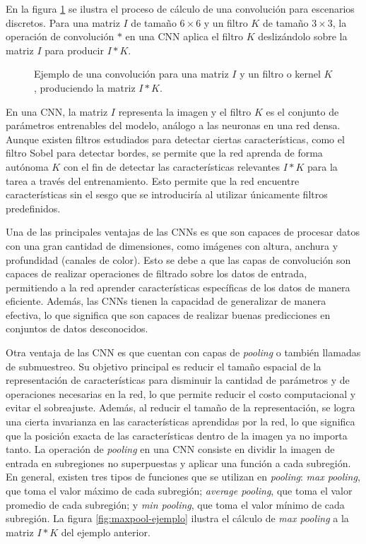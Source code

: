 En la figura \ref{fig:convolucion-ejemplo} se ilustra el proceso de cálculo de una convolución para escenarios
discretos. Para una matriz $I$ de tamaño $6\times6$ y un filtro $K$ de tamaño $3\times3$, la operación de convolución
$*$ en una CNN aplica el filtro $K$ deslizándolo sobre la matriz $I$ para producir $I*K$.

\begin{figure}[H]
  \centering
  \caption[Operador {\it convolución}]{Ejemplo de una convolución para una matriz $I$ y un filtro o kernel $K$, produciendo la matriz $I*K$.}
  \label{fig:convolucion-ejemplo}
\end{figure}

En una CNN, la matriz $I$ representa la imagen y el filtro $K$ es el conjunto de parámetros entrenables del modelo,
análogo a las neuronas en una red densa. Aunque existen filtros estudiados para detectar ciertas características, como
el filtro Sobel para detectar bordes, se permite que la red aprenda de forma autónoma $K$ con el fin de detectar las
características relevantes $I*K$ para la tarea a través del entrenamiento. Esto permite que la red encuentre
características sin el sesgo que se introduciría al utilizar únicamente filtros predefinidos.

Una de las principales ventajas de las CNNs es que son capaces de procesar datos con una gran cantidad de dimensiones,
como imágenes con altura, anchura y profundidad (canales de color). Esto se debe a que las capas de convolución son
capaces de realizar operaciones de filtrado sobre los datos de entrada, permitiendo a la red aprender características
específicas de los datos de manera eficiente. Además, las CNNs tienen la capacidad de generalizar de manera efectiva,
lo que significa que son capaces de realizar buenas predicciones en conjuntos de datos desconocidos.

Otra ventaja de las CNN es que cuentan con capas de {\it pooling} o también llamadas de submuestreo. Su objetivo
principal es reducir el tamaño espacial de la representación de características para disminuir la cantidad de
parámetros y de operaciones necesarias en la red, lo que permite reducir el costo computacional y evitar el
sobreajuste. Además, al reducir el tamaño de la representación, se logra una cierta invarianza en las características
aprendidas por la red, lo que significa que la posición exacta de las características dentro de la imagen ya no importa
tanto. La operación de {\it pooling} en una CNN consiste en dividir la imagen de entrada en subregiones no superpuestas
y aplicar una función a cada subregión. En general, existen tres tipos de funciones que se utilizan en {\it pooling}:
{\it max pooling}, que toma el valor máximo de cada subregión; {\it average pooling}, que toma el valor promedio de
cada subregión; y {\it min pooling}, que toma el valor mínimo de cada subregión. La figura \ref{fig:maxpool-ejemplo}
ilustra el cálculo de {\it max pooling} a la matriz $I*K$ del ejemplo anterior.

